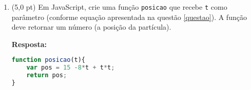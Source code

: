 \documentclass[12pt,a4paper,oneside]{article}
\begin{document}
\begin{enumerate}
	\vspace{0.3cm}

{ \color{blue} 
	{\bf Resposta:} 
	\begin{enumerate}
		\item $x = 15 -8t  + t^2$ \ \ 
		$\therefore$ \ \  $v = -8 + 2t$ (derivada primeira)\\
		Para $t = 1$ s, temos \\
		$v = -8 + 2.1 = -6$ m/s
		\item Sentido negativo, pois a velocidade tem valor negativo.
		\item $v_{esc} = |v| = 6$ m/s
		\item Está diminuindo. Pois a aceleração do objeto é positiva \\
		$v = -8 + 2t$ \ \ 
		$\therefore$ \ \  $a = 2$ (derivada primeira)\\
		e a velocidade instantânea é negativa. Logo, a tendência é a velocidade escalar diminuir (e não o oposto).
		\item Sim, quando $t = 4$ s. \\
		Para $v=0$, temos\\
		$0 = -8 + 2t$ \ \ $\therefore$ \ \ $2t = 8$ \ \ $\therefore$ \ \ $t = 4$ s.
		\item Não, não existe. Pois para qualquer valor de $t >  4$ s, a velocidade instantânea será sempre positiva.
	\end{enumerate}
}

\newpage

	\item (5,0 pt) Em JavaScript, crie uma função {\tt posicao} que recebe {\tt t} como parâmetro (conforme equação apresentada na questão \ref{questao}). A função deve retornar um número (a posição da partícula).
	
		{\color{blue} {\bf Resposta:} }
	
	\begin{lstlisting}[language=JavaScript]
function posicao(t){
	var pos = 15 -8*t + t*t;
	return pos;
}\end{lstlisting}
	
	\end{enumerate}
\end{document}

